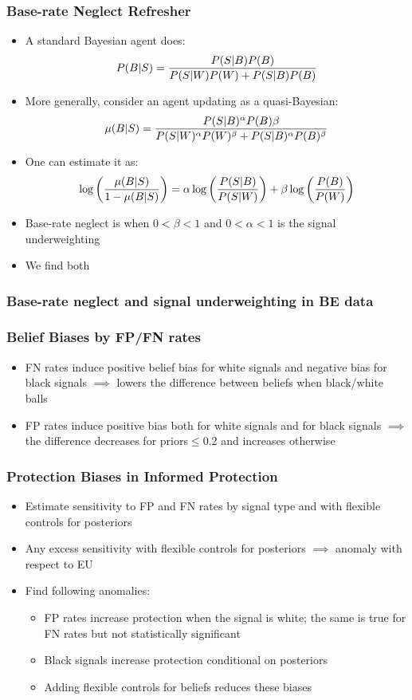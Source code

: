 \documentclass[11pt,hyperref={bookmarks=false}]{beamer}
\begin{document}
\begin{frame}
\frametitle{Base-rate Neglect Refresher}
\begin{itemize}
\item A standard Bayesian agent does:
$$P(B|S)={P(S|B)P(B)\over P(S|W)P(W)+P(S|B)P(B)}$$
\item More generally, consider an agent updating as a quasi-Bayesian:
$$\mu(B|S)={P(S|B)^{\alpha}P(B){\beta}\over P(S|W)^{\alpha} P(W)^{\beta}+P(S|B)^{\alpha}P(B)^{\beta}} $$
\item One can estimate it as:
$$\log\left({\mu(B|S) \over 1-\mu(B|S)}\right)=\alpha \log\left({P(S|B) \over P(S|W)}\right)+\beta \log \left({P(B)\over P(W)}\right)$$
\item Base-rate neglect is when $0<\beta<1$ and $0<\alpha<1$ is the signal underweighting
\item We find both
\end{itemize}
\end{frame}


\begin{frame}
\frametitle{Base-rate neglect and signal underweighting in BE data}
\footnotesize

\end{frame}



\begin{frame}
\frametitle{Belief Biases by FP/FN rates}
\begin{itemize}
\item FN rates induce positive belief bias for white signals and negative bias for black signals $\implies$ lowers the difference between beliefs when black/white balls
\item FP rates induce positive bias both for white signals and for black signals $\implies$ the difference decreases for priors$\leq$0.2 and increases otherwise
\end{itemize}
\scriptsize

\end{frame}



\begin{frame}
\frametitle{Protection Biases in Informed Protection}
\begin{itemize}
\item Estimate sensitivity to FP and FN rates by signal type and with flexible controls for posteriors
\item Any excess sensitivity with flexible controls for posteriors $\implies$ anomaly with respect to EU
\item Find following anomalies:
\begin{itemize}
\item FP rates increase protection when the signal is white; the same is true for FN rates but not statistically significant
\item Black signals increase protection conditional on posteriors
\item Adding flexible controls for beliefs reduces these biases
\end{itemize}
\end{itemize}
\end{frame}
\end{document}

